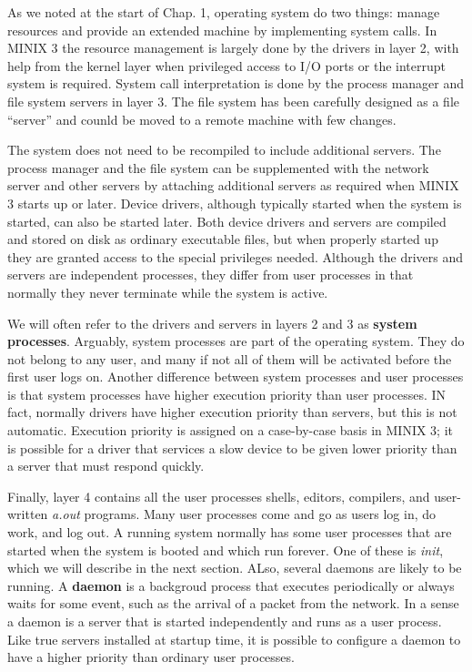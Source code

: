 \documentclass{book}
\newcommand {\kw}  [1] {\textbf{#1}}
\newcommand {\sys} [1] {\textsl{#1}}
\begin{document}
As we noted at the start of Chap. 1, operating system do two things: manage resources and provide an extended machine by implementing system calls.
In MINIX 3 the resource management is largely done by the drivers in layer 2, 
with help from the kernel layer when privileged access to I/O ports or the interrupt system is required.
System call interpretation is done by the process manager and file system servers in layer 3.
The file system has been carefully designed as a file ``server'' and counld be moved to a remote machine with few changes.

The system does not need to be recompiled to include additional servers.
The process manager and the file system can be supplemented with the network server and other servers 
by attaching additional servers as required when MINIX 3 starts up or later.
Device drivers, although typically started when the system is started, can also be started later.
Both device drivers and servers are compiled and stored on disk as ordinary executable files,
but when properly started up they are granted access to the special privileges needed.
Although the drivers and servers are independent processes, 
they differ from user processes in that normally they never terminate while the system is active.

We will often refer to the drivers and servers in layers 2 and 3 as \kw{system processes}.
Arguably, system processes are part of the operating system.
They do not belong to any user, and many if not all of them will be activated before the first user logs on.
Another difference between system processes and user processes is that
system processes have higher execution priority than user processes.
IN fact, normally drivers have higher execution priority than servers, but this is not automatic.
Execution priority is assigned on a case-by-case basis in MINIX 3;
it is possible for a driver that services a slow device to be given lower priority than a server that must respond quickly.

Finally, layer 4 contains all the user processes shells, editors, compilers, and user-written \sys{a.out} programs.
Many user processes come and go as users log in, do work, and log out.
A running system normally has some user processes that are started when the system is booted and which run forever.
One of these is \sys{init}, which we will describe in the next section.
ALso, several daemons are likely to be running.
A \kw{daemon} is a backgroud process that executes periodically or always waits for some event,
such as the arrival of a packet from the network.
In a sense a daemon is a server that is started independently and runs as a user process.
Like true servers installed at startup time, it is possible to configure a daemon to have a higher priority than ordinary user processes.
\end{document}
